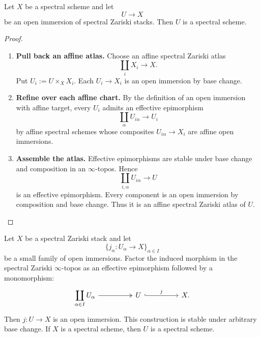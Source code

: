 \begin{lemma}
\label{lem:open-substack-spectral-scheme}
Let \(X\) be a spectral scheme and let
\[
    U\longrightarrow X
\]
be an open immersion of spectral Zariski stacks. Then \(U\) is a spectral
scheme.
\end{lemma}

\begin{proof}
\leavevmode
\begin{enumerate}[label=\textup{(\arabic*)}]
    \item \textbf{Pull back an affine atlas.}
    Choose an affine spectral Zariski atlas
    \[
        \coprod_iX_i\longrightarrow X.
    \]
    Put \(U_i:=U\times_XX_i\). Each \(U_i\to X_i\) is an open immersion by
    base change.

    \item \textbf{Refine over each affine chart.}
    By the definition of an open immersion with affine target, every \(U_i\)
    admits an effective epimorphism
    \[
        \coprod_\alpha U_{i\alpha}\longrightarrow U_i
    \]
    by affine spectral schemes whose composites
    \(U_{i\alpha}\to X_i\) are affine open immersions.

    \item \textbf{Assemble the atlas.}
    Effective epimorphisms are stable under base change and composition in an
    \(\infty\)-topos. Hence
    \[
        \coprod_{i,\alpha}U_{i\alpha}\longrightarrow U
    \]
    is an effective epimorphism. Every component is an open immersion by
    composition and base change. Thus it is an affine spectral Zariski atlas
    of \(U\).
\end{enumerate}
\end{proof}

\begin{proposition}
\label{prop:unions-open-substacks}
Let \(X\) be a spectral Zariski stack and let
\[
    \{j_\alpha:U_\alpha\to X\}_{\alpha\in I}
\]
be a small family of open immersions. Factor the induced morphism in the
spectral Zariski \(\infty\)-topos as an effective epimorphism followed by a
monomorphism:
\[
\begin{tikzcd}[column sep=huge]
    \displaystyle\coprod_{\alpha\in I}U_\alpha
        \arrow[r, two heads]
    &
    U
        \arrow[r, hook, "j"]
    &
    X.
\end{tikzcd}
\]
Then \(j:U\to X\) is an open immersion. This construction is stable under
arbitrary base change. If \(X\) is a spectral scheme, then \(U\) is a
spectral scheme.
\end{proposition}

